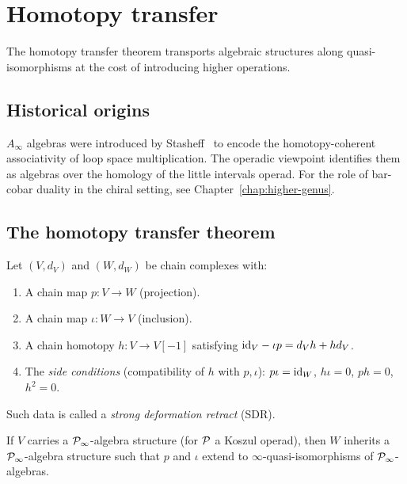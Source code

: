 \chapter{Homotopy transfer}
\label{app:homotopy-transfer}


The homotopy transfer theorem transports algebraic structures along quasi-isomorphisms
at the cost of introducing higher operations.

\section{Historical origins}
\label{sec:ainfty-historical}

$A_\infty$ algebras were introduced by Stasheff~\cite{Sta63} to encode the homotopy-coherent associativity of loop space multiplication.  The operadic viewpoint identifies them as algebras over the homology of the little intervals operad.  For the role of bar-cobar duality in the chiral setting, see Chapter~\ref{chap:higher-genus}.

\section{The homotopy transfer theorem}
\label{sec:htt}

\begin{theorem}
\label{thm:htt}
Let $(V, d_V)$ and $(W, d_W)$ be chain complexes with:
\begin{enumerate}[label=(\roman*)]
\item A chain map $p: V \to W$ (projection).
\item A chain map $\iota: W \to V$ (inclusion).
\item A chain homotopy $h: V \to V[-1]$ satisfying $\mathrm{id}_V - \iota p = d_V h + h d_V$.
\item The \emph{side conditions} (compatibility of $h$ with $p, \iota$): $p \iota = \mathrm{id}_W$, $h \iota = 0$, $p h = 0$, $h^2 = 0$.
\end{enumerate}
Such data is called a \emph{strong deformation retract} (SDR).

If $V$ carries a $\mathcal{P}_\infty$-algebra structure (for $\mathcal{P}$ a Koszul operad), 
then $W$ inherits a $\mathcal{P}_\infty$-algebra structure such that $p$ and $\iota$ 
extend to $\infty$-quasi-isomorphisms of $\mathcal{P}_\infty$-algebras.
\end{theorem}

